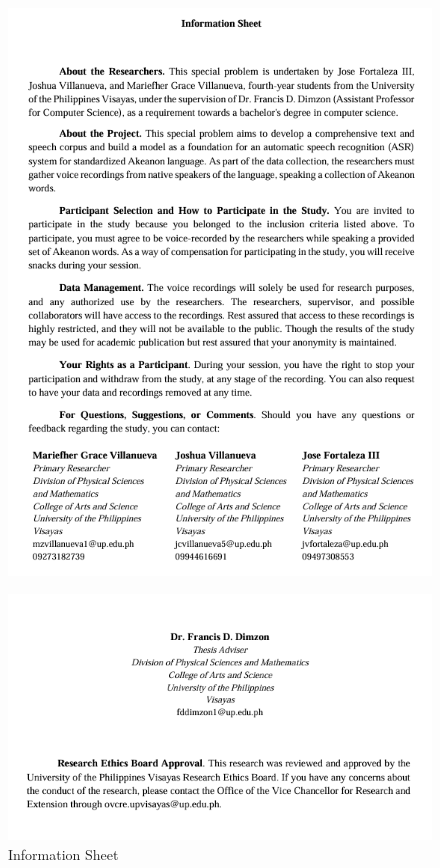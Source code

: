 \begin{figure}[h!]
	\centering
	\includegraphics[width=\textwidth]{./appendix/information_sheet.png}
\end{figure}
\begin{figure}[h!]
	\centering
	\includegraphics[width=\textwidth]{./appendix/information_sheet1.png}
	\caption{Information Sheet}
	\label{fig:InformationSheet }
\end{figure}

